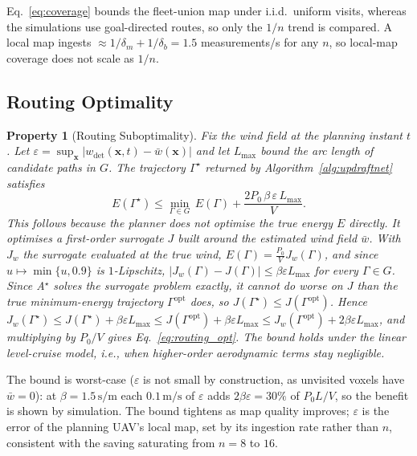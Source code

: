\documentclass[conference]{IEEEtran}
\newcommand{\rd}[1]{#1}   %
\newcommand{\wdet}{w_{\mathrm{det}}}
\newtheorem{property}{Property}
\begin{document}
\rd{Eq.~\eqref{eq:coverage} bounds the fleet-union map under i.i.d.\ uniform visits, whereas the simulations use goal-directed routes, so only the $1/n$ trend is compared.
A local map ingests $\approx1/\delta_m+1/\delta_b=1.5$ measurements/s for any $n$, so local-map coverage does not scale as $1/n$.}

\subsection{Routing Optimality}

\begin{property}[Routing Suboptimality]
\label{prop:routing}
\rd{Fix the wind field at the planning instant $t$. Let $\varepsilon=\sup_{\mathbf{x}}|\wdet(\mathbf{x},t)-\bar{w}(\mathbf{x})|$ and let $L_{\max}$ bound the arc length of candidate paths in $G$.}
The trajectory $\Gamma^\star$ returned by Algorithm~\ref{alg:updraftnet}
satisfies
\begin{equation}
E(\Gamma^\star) \leq \min_{\Gamma\rd{\in G}}\,E(\Gamma) \rd{{}+ \frac{2P_0\,\beta\,\varepsilon\,L_{\max}}{V}}.
\label{eq:routing_opt}
\end{equation}
This follows because the planner does not optimise the true
energy $E$ directly. It optimises a first-order surrogate $J$ built
around the estimated wind field $\bar{w}$\rd{. With $J_w$ the surrogate evaluated at the true wind, $E(\Gamma)=\frac{P_0}{V}J_w(\Gamma)$, and since
$u\mapsto\min\{u,0.9\}$ is $1$-Lipschitz, $|J_w(\Gamma)-J(\Gamma)|\le\beta\varepsilon L_{\max}$ for every $\Gamma\in G$}.
Since A$^\star$ solves the surrogate problem exactly, it
cannot do worse on $J$ than the true minimum-energy trajectory
$\Gamma^{\mathrm{opt}}$ does, so $J(\Gamma^\star)\le J(\Gamma^{\mathrm{opt}})$.
\rd{Hence $J_w(\Gamma^\star)\le J(\Gamma^\star)+\beta\varepsilon L_{\max}\le J(\Gamma^{\mathrm{opt}})+\beta\varepsilon L_{\max}\le J_w(\Gamma^{\mathrm{opt}})+2\beta\varepsilon L_{\max}$,
and multiplying by $P_0/V$ gives Eq.~\eqref{eq:routing_opt}.} The
bound holds \rd{under the linear level-cruise model, i.e.,} when
higher-order aerodynamic terms stay negligible.
\end{property}

\rd{The bound is worst-case ($\varepsilon$ is not small by construction, as unvisited voxels have $\bar{w}=0$): at $\beta=1.5\,\mathrm{s/m}$ each $0.1\,\mathrm{m/s}$ of $\varepsilon$ adds
$2\beta\varepsilon=30\%$ of $P_0L/V$, so the benefit is shown by simulation.} The bound tightens as
map quality improves\rd{; $\varepsilon$ is the error of the planning UAV's local map, set by its ingestion rate rather than $n$, consistent with the saving saturating from $n=8$ to $16$}.
\end{document}
